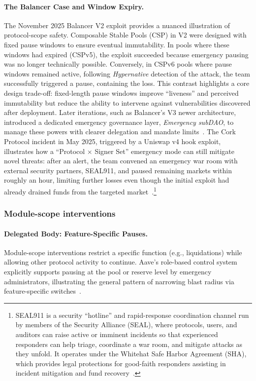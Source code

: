 \documentclass[12pt]{article}
\begin{document}
\paragraph{The Balancer Case and Window Expiry.}
The November 2025 Balancer V2 exploit provides a nuanced illustration of protocol-scope safety. Composable Stable Pools (CSP) in V2 were designed with fixed pause windows to ensure eventual immutability. In pools where these windows had expired (CSPv5), the exploit succeeded because emergency pausing was no longer technically possible. Conversely, in CSPv6 pools where pause windows remained active, following \emph{Hypernative} detection of the attack, the team successfully triggered a pause, containing the loss. This contrast highlights a core design trade-off: fixed-length pause windows improve ``liveness'' and perceived immutability but reduce the ability to intervene against vulnerabilities discovered after deployment. Later iterations, such as Balancer's V3 newer architecture, introduced a dedicated emergency governance layer, \emph{Emergency subDAO}, to manage these powers with clearer delegation and mandate limits~\cite{BalancerPostMortem2025,BalancerV3EmergencySubDAO}. The Cork Protocol incident in May 2025, triggered by a Uniswap v4 hook exploit, illustrates how a ``Protocol $\times$ Signer Set'' emergency mode can still mitigate novel threats: after an alert, the team convened an emergency war room with external security partners, SEAL911, and paused remaining markets within roughly an hour, limiting further losses even though the initial exploit had already drained funds from the targeted market~\cite{CorkPostMortem2025}.\footnote{SEAL911 is a security ``hotline'' and rapid-response coordination channel run by members of the Security Alliance (SEAL), where protocols, users, and auditors can raise active or imminent incidents so that experienced responders can help triage, coordinate a war room, and mitigate attacks as they unfold. It operates under the Whitehat Safe Harbor Agreement (SHA), which provides legal protections for good-faith responders assisting in incident mitigation and fund recovery~\cite{seal911github,dedaubseal,piperwhitehat}.}


\subsubsection{Module-scope interventions}
\label{sec:incidents-module}

\paragraph{Delegated Body: Feature-Specific Pauses.}
Module-scope interventions restrict a specific function (e.g., liquidations) while allowing other protocol activity to continue. Aave's role-based control system explicitly supports pausing at the pool or reserve level by emergency administrators, illustrating the general pattern of narrowing blast radius via feature-specific switches~\cite{AaveACLManager,AaveDPIFreezeProposal}.
\end{document}
